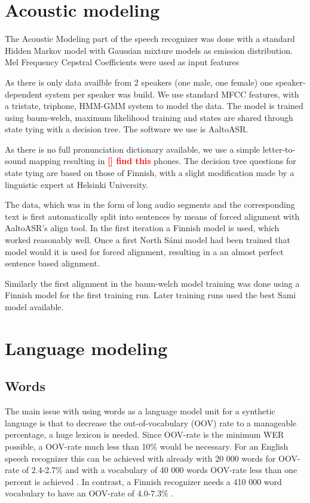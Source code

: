 \documentclass[b5paper]{article}
\newcommand{\todo}[2]{{\textcolor{red}{\bf [#1] #2 }}}
\newcommand{\ns}{{North Sámi }}
\begin{document}
\section{Acoustic modeling}
The Acoustic Modeling part of the speech recognizer was done with a standard Hidden Markov model with Gaussian mixture models as emission distribution. Mel Frequency Cepstral Coefficients were used as input features


As there is only data availble from 2 speakers (one male, one female) one speaker-dependent system per speaker was build. We use standard MFCC features, with  a tristate, triphone, HMM-GMM system to model the data. The model is trained using baum-welch, maximum likelihood training and states are shared through state tying with a decision tree. The software we use is AaltoASR.

As there is no full pronunciation dictionary available, we use a simple letter-to-sound mapping resulting in \todo{}{find this} phones. The decision tree questions for state tying are based on those of Finnish, with a slight modification made by a linguistic expert at Helsinki University.

The data, which was in the form of long audio segments and the corresponding text is first automatically split into sentences by means of forced alignment with AaltoASR's align tool. In the first iteration a Finnish model is used, which worked reasonably well. Once a first \ns model had been trained that model would it is used for forced alignment, resulting in a an almost perfect sentence based alignment.

Similarly the first alignment in the baum-welch model training was done using a Finnish model for the first training run. Later training runs used the best Sami model available.


\section{Language modeling}

\subsection{Words}

The main issue with using words as a language model unit for a synthetic language is that to decrease the out-of-vocabulary (OOV) rate to a manageable percentage, a huge lexicon is needed. Since OOV-rate is the minimum WER possible, a OOV-rate much less than 10\% would be necessary. For an English speech recognizer this can be achieved with already with 20 000 words for OOV-rate of 2.4-2.7\% and with a vocabulary of 40 000 words OOV-rate less than one percent is achieved \cite{woodland19951994}. In contrast, a Finnish recognizer needs a 410 000 word vocabulary to have an OOV-rate of 4.0-7.3\% \cite{hirsimaki2006unlimited}.
\end{document}
